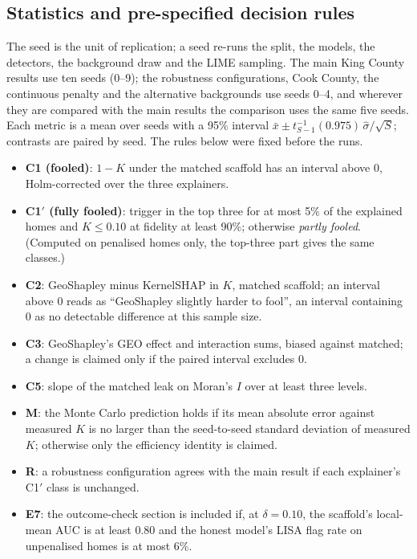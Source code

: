 \documentclass[11pt]{article}
\newcommand{\1}{\mathbf{1}}
\begin{document}
\subsection{Statistics and pre-specified decision rules}
The seed is the unit of replication; a seed re-runs the split, the models, the detectors, the background draw and the
LIME sampling. The main King County results use ten seeds (0--9); the robustness configurations, Cook County, the
continuous penalty and the alternative backgrounds use seeds 0--4, and wherever they are compared with the main results
the comparison uses the same five seeds. Each metric is a mean over seeds with a 95\% interval $\bar x \pm t_{S-1}^{-1}(0.975)\,\hat\sigma/\sqrt S$;
contrasts are paired by seed. The rules below were fixed before the runs.
\begin{itemize}
  \item \textbf{C1 (fooled)}: $1 - K$ under the matched scaffold has an interval above 0, Holm-corrected over the three
        explainers.
  \item \textbf{C1$'$ (fully fooled)}: trigger in the top three for at most 5\% of the explained homes and $K \le
        0.10$ at fidelity at least 90\%; otherwise \emph{partly fooled}. (Computed on penalised homes only, the
        top-three part gives the same classes.)
  \item \textbf{C2}: GeoShapley minus KernelSHAP in $K$, matched scaffold; an interval above 0 reads as
        ``GeoShapley slightly harder to fool'', an interval containing 0 as no detectable difference at this sample
        size.
  \item \textbf{C3}: GeoShapley's GEO effect and interaction sums, biased against matched; a change is claimed only if
        the paired interval excludes 0.
  \item \textbf{C5}: slope of the matched leak on Moran's $I$ over at least three levels.
  \item \textbf{M}: the Monte Carlo prediction holds if its mean absolute error against measured $K$ is no larger than
        the seed-to-seed standard deviation of measured $K$; otherwise only the efficiency identity is claimed.
  \item \textbf{R}: a robustness configuration agrees with the main result if each explainer's C1$'$ class is unchanged.
  \item \textbf{E7}: the outcome-check section is included if, at $\delta = 0.10$, the scaffold's local-mean AUC is at
        least 0.80 and the honest model's LISA flag rate on unpenalised homes is at most 6\%.
\end{itemize}
\end{document}
